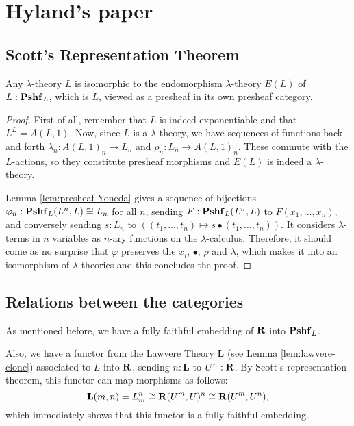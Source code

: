 \chapter{Hyland's paper}


\section{Scott's Representation Theorem}
\begin{theorem}\label{thm:representation-theorem}
  Any $ \lambda $-theory $ L $ is isomorphic to the endomorphism $ \lambda $-theory $ E(L) $ of $ L: \mathbf{Pshf}_{L} $, which is $ L $, viewed as a presheaf in its own presheaf category.
\end{theorem}
\begin{proof}
  First of all, remember that $ L $ is indeed exponentiable and that $ L^L = A(L, 1) $.
  Now, since $ L $ is a $ \lambda $-theory, we have sequences of functions back and forth $ \lambda_n: A(L, 1)_n \to L_n $ and $ \rho_n: L_n \to A(L, 1)_n $. These commute with the $ L $-actions, so they constitute presheaf morphisms and $ E(L) $ is indeed a $ \lambda $-theory.

  Lemma \ref{lem:presheaf-Yoneda} gives a sequence of bijections $ \varphi_n : \mathbf{Pshf}_{L}(L^n, L) \cong L_n $ for all $ n $, sending $ F: \mathbf{Pshf}_{L}(L^n, L) $ to $ F(x_1, \dots, x_n) $, and conversely sending $ s: L_n $ to $ ((t_1, \dots, t_n) \mapsto s \bullet (t_1, \dots, t_n)) $. It considers $ \lambda $-terms in $ n $ variables as $ n $-ary functions on the $ \lambda $-calculus. Therefore, it should come as no surprise that $ \varphi $ preserves the $ x_i $, $ \bullet $, $ \rho $ and $ \lambda $, which makes it into an isomorphism of $ \lambda $-theories and this concludes the proof.
\end{proof}

\section{Relations between the categories}

As mentioned before, we have a fully faithful embedding of $ \mathbf{R} $ into $ \mathbf{Pshf}_{L} $.

Also, we have a functor from the Lawvere Theory $ \mathbf{L} $ (see Lemma \ref{lem:lawvere-clone}) associated to $ L $ into $ \mathbf{R} $, sending $ n : \mathbf L $ to $ U^n : \mathbf{R} $. By Scott's representation theorem, this functor can map morphisms as follows:
\[ \mathbf L(m, n) = L_m^n \cong \mathbf{R}(U^m, U)^n \cong \mathbf{R}(U^m, U^n), \]
which immediately shows that this functor is a fully faithful embedding.


